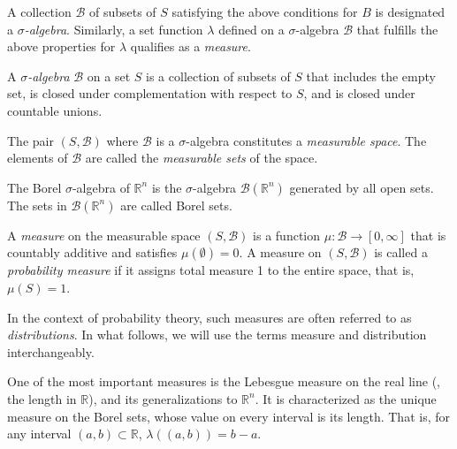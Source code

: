 A collection $\mathcal{B}$ of subsets of $S$ satisfying the above conditions for $B$ is designated a $\sigma$\emph{-algebra}. Similarly, a set function $\lambda$ defined on a $\sigma$-algebra $\mathcal{B}$ that fulfills the above properties for $\lambda$ qualifies as a \emph{measure}.

\begin{definition} 
  A $\sigma$\emph{-algebra} $\mathcal{B}$ on a set $S$ is a collection of subsets of $S$ that includes the empty set, is closed under complementation with respect to $S$, and is closed under countable unions. 
\end{definition}

\begin{definition} 
  The pair $(S, \mathcal{B})$ where $\mathcal{B}$ is a $\sigma$-algebra constitutes a \emph{measurable space}. The elements of $\mathcal{B}$ are called  the \emph{measurable sets} of the space. 
\end{definition}

\begin{definition}  
   The Borel $\sigma$-algebra of $\mathbb{R}^n$ is the $\sigma$-algebra $\mathcal{B}(\mathbb{R}^n)$ generated by all open sets. The sets in $\mathcal{B}(\mathbb{R}^n)$ are called Borel sets. %
\end{definition}


\begin{definition} 
  A  \emph{measure} on the measurable space $(S,\mathcal{B})$ is a function $\mu: \mathcal{B} \to  [0,\infty] $ that is countably additive and satisfies $\mu(\emptyset)=0$. A measure  on $(S,\mathcal{B})$ is called a \emph{probability measure} if it assigns total measure 1 to the entire space, that is, $\mu(S) = 1$.
\end{definition}

 In the context of probability theory, such measures are often referred to as \emph{distributions}. In what follows, we will use the terms measure and distribution interchangeably.

 

 One of the most important measures is the Lebesgue measure on the real line (\ie, the length in $\mathbb{R}$), and its generalizations to $\mathbb{R}^n$.  It is characterized as the unique measure on the Borel sets, whose value on every interval is its length. That is, for any interval $(a, b) \subset \mathbb{R}$,
$
\lambda((a, b)) = b - a.$

